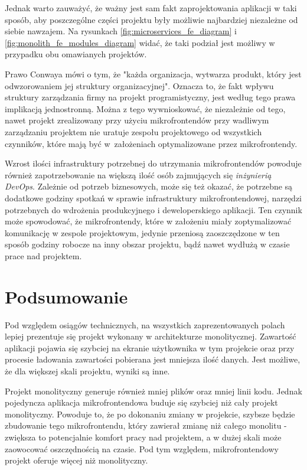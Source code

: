 \documentclass{SGGW-thesis}
\begin{document}
  Jednak warto zauważyć, że ważny jest sam fakt zaprojektowania aplikacji w taki sposób, aby poszczególne części projektu były możliwie najbardziej niezależne od siebie nawzajem. Na rysunkach \cref{fig:microservices_fe_diagram} i \cref{fig:monolith_fe_modules_diagram} widać, że taki podział jest możliwy w przypadku obu omawianych projektów.

  Prawo Conwaya \cite{conway} mówi o tym, że "każda organizacja, wytwarza produkt, który jest odwzorowaniem jej struktury organizacyjnej". Oznacza to, że fakt wpływu struktury zarządzania firmy na projekt programistyczny, jest według tego prawa implikacją jednostronną. Można z tego wywnioskować, że niezależnie od tego, nawet projekt zrealizowany przy użyciu mikrofrontendów przy wadliwym zarządzaniu projektem nie uratuje zespołu projektowego od wszystkich czynników, które mają być w~założeniach optymalizowane przez mikrofrontendy.

  Wzrost ilości infrastruktury potrzebnej do utrzymania mikrofrontendów powoduje również zapotrzebowanie na większą ilość osób zajmujących się \textit{inżynierią DevOps}. Zależnie od potrzeb biznesowych, może się też okazać, że potrzebne są dodatkowe godziny spotkań w sprawie infrastruktury mikrofrontendowej, narzędzi potrzebnych do wdrożenia produkcyjnego i deweloperskiego aplikacji. Ten czynnik może spowodować, że mikrofrontendy, które w założeniu miały zoptymalizować komunikację w zespole projektowym, jedynie przeniosą zaoszczędzone w ten sposób godziny robocze na inny obszar projektu, bądź nawet wydłużą w czasie prace nad projektem.

\chapter{Podsumowanie}
Pod względem osiągów technicznych, na wszystkich zaprezentowanych polach lepiej prezentuje się projekt wykonany w architekturze monolitycznej. Zawartość aplikacji pojawia się szybciej na ekranie użytkownika w tym projekcie oraz przy procesie ładowania zawartości pobierana jest mniejsza ilość danych. Jest możliwe, że dla większej skali projektu, wyniki są inne.

Projekt monolityczny generuje również mniej plików oraz mniej linii kodu. Jednak pojedyncza aplikacja mikrofrontendowa buduje się szybciej niż cały projekt monolityczny. Powoduje to, że po dokonaniu zmiany w projekcie, szybsze będzie zbudowanie tego mikrofrontendu, który zawierał zmianę niż całego monolitu - zwiększa to potencjalnie komfort pracy nad projektem, a w dużej skali może zaowocować oszczędnością na czasie. Pod tym względem, mikrofrontendowy projekt oferuje więcej niż monolityczny.
\end{document}
